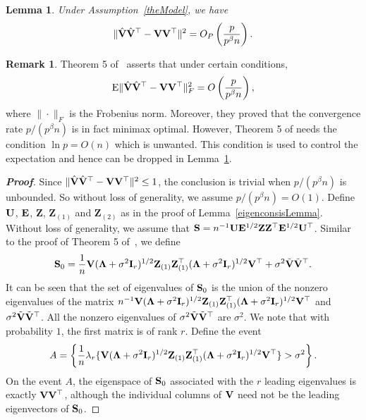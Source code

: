 \documentclass[times,sort&compress,3p]{elsarticle}
\newcommand{\myE}{ {\rm E} }
\newcommand{\bZ}{\mathbf{Z}}
\theoremstyle{plain}
\newtheorem{lemma}{\quad\quad Lemma}
\theoremstyle{definition}
\newtheorem{remark}{\quad\quad Remark}
\theoremstyle{remark}
\begin{document}
\begin{appendices}
\begin{lemma}\label{conRateLemma}
    Under Assumption~\ref{theModel}, we have
\begin{equation*}
\|\hat{\mathbf{V}}\hat{\mathbf{V}}^\top -\mathbf{V}\mathbf{V}^\top \|^2 =O_P\left(\frac{p}{p^{\beta}n}\right).
\end{equation*}
\end{lemma}
\begin{remark}
    Theorem 5 of~\cite{Cai2012Sparse} asserts that under certain conditions,
$$
\myE \|\hat{\BV}\hat{\BV}^\top -\BV\BV^\top \|_F^2 =O\left(\frac{p}{p^{\beta}n}\right),
    $$
    where $\|\cdot\|_F$ is the Frobenius norm.
    Moreover, they proved that the convergence rate $p/(p^{\beta}n)$ is in fact minimax optimal.
    However,  Theorem 5 of \cite{Cai2012Sparse} needs the condition $\ln p=O(n)$ which is unwanted.
    This condition is used to control the expectation and hence can be dropped in Lemma~\ref{conRateLemma}.
\end{remark}
\begin{proof}[\textbf{Proof}]
    Since $\|\hat{\mathbf{V}}\hat{\mathbf{V}}^\top-\mathbf{V}\mathbf{V}^\top\|^2\leq 1$, the conclusion is trivial when $p/(p^{\beta} n)$ is unbounded.
    So without loss of generality, we assume $p/(p^{\beta} n)=O(1)$.
    Define $\mathbf{U}$, $\mathbf{E}$, $\bZ$, $\bZ_{(1)}$ and $\bZ_{(2)}$ as in the proof of Lemma~\ref{eigenconsisLemma}.
Without loss of generality, we assume that $\BS= n^{-1}\BU\BE^{1/2}\bZ \bZ^\top \BE^{1/2} \BU^\top$. 
    Similar to the proof of Theorem 5 of~\cite{Cai2012Sparse},
we define 
    $$
    \BS_0=
        \frac{1}{n}\BV(\bLambda+\sigma^2\BI_r)^{1/2}\bZ_{(1)} \bZ_{(1)}^\top(\bLambda+\sigma^2\BI_r)^{1/2}\BV^\top
        +\sigma^2\tilde{\BV}\tilde{\BV}^\top.
    $$
    It can be seen that the set of eigenvalues of $\mathbf{S}_0$ is the union of the nonzero eigenvalues of the matrix $n^{-1}\BV(\bLambda+\sigma^2\BI_r)^{1/2}\bZ_{(1)} \bZ_{(1)}^\top(\bLambda+\sigma^2\BI_r)^{1/2}\BV^\top$ and $\sigma^2\tilde{\mathbf{V}}\tilde{\mathbf{V}}^\top$.
All the nonzero eigenvalues of $\sigma^2\tilde{\mathbf{V}}\tilde{\mathbf{V}}^\top$ are $\sigma^2$.
We note that with probability $1$, the first matrix is of rank $r$.
        Define the event
        $$
        A=
        \left\{
            \frac{1}{n}\lambda_r\{\BV(\bLambda+\sigma^2 \BI_r)^{1/2}\bZ_{(1)} \bZ_{(1)}^\top(\bLambda+\sigma^2 \BI_r)^{1/2}\BV^\top\}
        >\sigma^2
        \right\}.
        $$
        On the event $A$, the eigenspace of $\mathbf{S}_0$ associated with the $r$ leading eigenvalues is exactly $\mathbf{V} \mathbf{V}^\top$, although the individual columns of $\mathbf{V}$ need not be the leading eigenvectors of $\mathbf{S}_0$.

\end{proof}
\end{appendices}
\end{document}
